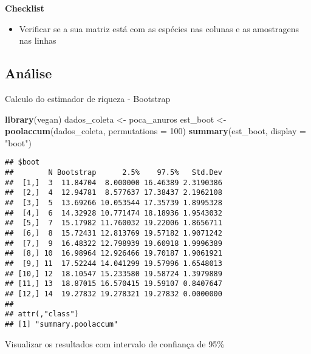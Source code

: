 \documentclass[
]{book}
\newenvironment{Shaded}{\begin{snugshade}}{\end{snugshade}}
\newcommand{\DataTypeTok}[1]{\textcolor[rgb]{0.13,0.29,0.53}{#1}}
\newcommand{\DecValTok}[1]{\textcolor[rgb]{0.00,0.00,0.81}{#1}}
\newcommand{\KeywordTok}[1]{\textcolor[rgb]{0.13,0.29,0.53}{\textbf{#1}}}
\newcommand{\NormalTok}[1]{#1}
\newcommand{\StringTok}[1]{\textcolor[rgb]{0.31,0.60,0.02}{#1}}
\providecommand{\tightlist}{%
  \setlength{\itemsep}{0pt}\setlength{\parskip}{0pt}}
\begin{document}
\textbf{Checklist}

\begin{itemize}
\tightlist
\item
  Verificar se a sua matriz está com as espécies nas colunas e as amostragens nas linhas
\end{itemize}

\hypertarget{anuxe1lise-5}{%
\subsection{Análise}\label{anuxe1lise-5}}

Calculo do estimador de riqueza - Bootstrap

\begin{Shaded}
\begin{Highlighting}[]
\KeywordTok{library}\NormalTok{(vegan)}
\NormalTok{dados_coleta <-}\StringTok{ }\NormalTok{poca_anuros}
\NormalTok{est_boot <-}\StringTok{ }\KeywordTok{poolaccum}\NormalTok{(dados_coleta, }\DataTypeTok{permutations =} \DecValTok{100}\NormalTok{)}
\KeywordTok{summary}\NormalTok{(est_boot, }\DataTypeTok{display =} \StringTok{"boot"}\NormalTok{)}
\end{Highlighting}
\end{Shaded}

\begin{verbatim}
## $boot
##        N Bootstrap      2.5%    97.5%   Std.Dev
##  [1,]  3  11.84704  8.000000 16.46389 2.3190386
##  [2,]  4  12.94781  8.577637 17.38437 2.1962108
##  [3,]  5  13.69266 10.053544 17.35739 1.8995328
##  [4,]  6  14.32928 10.771474 18.18936 1.9543032
##  [5,]  7  15.17982 11.760032 19.22006 1.8656711
##  [6,]  8  15.72431 12.813769 19.57182 1.9071242
##  [7,]  9  16.48322 12.798939 19.60918 1.9996389
##  [8,] 10  16.98964 12.926466 19.70187 1.9061921
##  [9,] 11  17.52244 14.041299 19.57996 1.6548013
## [10,] 12  18.10547 15.233580 19.58724 1.3979889
## [11,] 13  18.87015 16.570415 19.59107 0.8407647
## [12,] 14  19.27832 19.278321 19.27832 0.0000000
## 
## attr(,"class")
## [1] "summary.poolaccum"
\end{verbatim}

Visualizar os resultados com intervalo de confiança de 95\%
\end{document}
